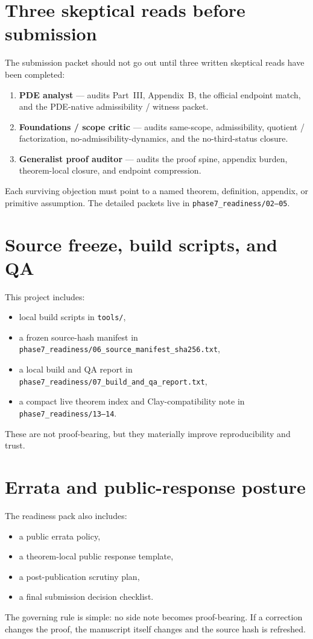 \documentclass[11pt]{article}
\begin{document}
\section{Three skeptical reads before submission}
The submission packet should not go out until three written skeptical reads have been completed:
\begin{enumerate}[leftmargin=1.5em]
\item \textbf{PDE analyst} --- audits Part~III, Appendix~B, the official endpoint match, and the PDE-native admissibility / witness packet.
\item \textbf{Foundations / scope critic} --- audits same-scope, admissibility, quotient / factorization, no-admissibility-dynamics, and the no-third-status closure.
\item \textbf{Generalist proof auditor} --- audits the proof spine, appendix burden, theorem-local closure, and endpoint compression.
\end{enumerate}
Each surviving objection must point to a named theorem, definition, appendix, or primitive assumption. The detailed packets live in \texttt{phase7\_readiness/02--05}.

\section{Source freeze, build scripts, and QA}
This project includes:
\begin{itemize}[leftmargin=1.5em]
\item local build scripts in \texttt{tools/},
\item a frozen source-hash manifest in \texttt{phase7\_readiness/06\_source\_manifest\_sha256.txt},
\item a local build and QA report in \texttt{phase7\_readiness/07\_build\_and\_qa\_report.txt},
\item a compact live theorem index and Clay-compatibility note in \texttt{phase7\_readiness/13--14}.
\end{itemize}
These are not proof-bearing, but they materially improve reproducibility and trust.

\section{Errata and public-response posture}
The readiness pack also includes:
\begin{itemize}[leftmargin=1.5em]
\item a public errata policy,
\item a theorem-local public response template,
\item a post-publication scrutiny plan,
\item a final submission decision checklist.
\end{itemize}
The governing rule is simple: no side note becomes proof-bearing. If a correction changes the proof, the manuscript itself changes and the source hash is refreshed.
\end{document}
